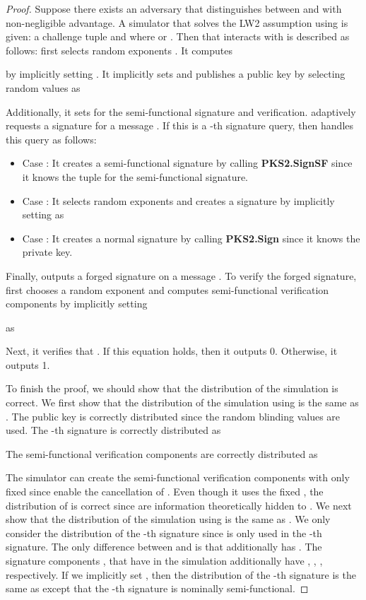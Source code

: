 \documentclass[11pt,letterpaper]{article}
\newcommand{\vs}{\vspace{1.5mm}}
\newcommand{\tb}[1]{\textbf{#1}}
\begin{document}
\begin{proof}
Suppose there exists an adversary  that distinguishes between
 and  with non-negligible advantage. A
simulator  that solves the LW2 assumption using  is given:
a challenge tuple
     and 
where  or . Then  that
interacts with  is described as follows:  first selects
random exponents . It
computes
    
by implicitly setting . It
implicitly sets  and publishes a public key  by
selecting random values  as
    
Additionally, it sets  for the semi-functional
signature and verification.  adaptively requests a signature for a
message . If this is a -th signature query, then  handles
this query as follows:
\begin{itemize}
\item {Case } : It creates a semi-functional signature by calling
    \tb{PKS2.SignSF} since it knows the tuple  for the
    semi-functional signature.

\item {Case } : It selects random exponents  and creates a signature by implicitly setting  as
    

\item {Case } : It creates a normal signature by calling
    \tb{PKS2.Sign} since it knows the private key.
\end{itemize}

\noindent Finally,  outputs a forged signature  on a message . To verify the forged
signature,  first chooses a random exponent  and
computes semi-functional verification components by implicitly setting
    
as
    
Next, it verifies that
    .
If this equation holds, then it outputs 0. Otherwise, it outputs 1.

\vs To finish the proof, we should show that the distribution of the
simulation is correct. We first show that the distribution of the simulation
using  is the same as . The public key is
correctly distributed since the random blinding values  are
used. The -th signature is correctly distributed as
    
The semi-functional verification components are correctly distributed as
    
The simulator can create the semi-functional verification components with
only fixed  since  enable the cancellation of
. Even though it uses the fixed , the distribution of
 is correct since  are information theoretically hidden to
.
We next show that the distribution of the simulation using  is the same as . We only consider the distribution of
the -th signature since  is only used in the -th signature. The only
difference between  and  is that  additionally has . The
signature components ,  that have  in
the simulation additionally have , ,
,  respectively. If we implicitly set , then the distribution of the -th signature is the same as
 except that the -th signature is nominally semi-functional.


\end{proof}
\end{document}

